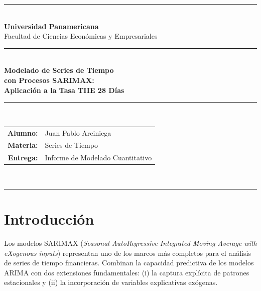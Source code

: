 \documentclass[12pt, letterpaper]{article}
\begin{document}
\thispagestyle{empty}
\begin{center}
  {\color{upazul}\rule{\linewidth}{1.5pt}}\\[8pt]
  {\Large\bfseries\color{upazul} Universidad Panamericana}\\[4pt]
  {\large Facultad de Ciencias Económicas y Empresariales}\\[14pt]
  {\color{upazul}\rule{\linewidth}{0.5pt}}\\[20pt]

  {\LARGE\bfseries\color{upazul}
    Modelado de Series de Tiempo\\[4pt]
    con Procesos SARIMAX:\\[4pt]
    Aplicación a la Tasa TIIE 28 Días}\\[20pt]

  {\color{upazul}\rule{\linewidth}{0.5pt}}\\[14pt]

  \begin{tabular}{rl}
    \textbf{Alumno:}   & Juan Pablo Arciniega \\[4pt]
    \textbf{Materia:}  & Series de Tiempo \\[4pt]

    \textbf{Entrega:}  & Informe de Modelado Cuantitativo \\
  \end{tabular}\\[24pt]

  {\color{upazul}\rule{\linewidth}{1.5pt}}
\end{center}

\newpage
\tableofcontents
\newpage

\section{Introducción}

Los modelos SARIMAX (\textit{Seasonal AutoRegressive Integrated Moving Average with eXogenous inputs}) representan uno de los marcos más completos para el análisis de series de tiempo financieras. Combinan la capacidad predictiva de los modelos ARIMA con dos extensiones fundamentales: (i) la captura explícita de patrones estacionales y (ii) la incorporación de variables explicativas exógenas.
\end{document}
